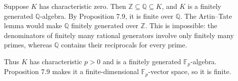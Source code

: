 Suppose $K$ has characteristic zero. Then $\mathbb{Z}\subseteq\mathbb{Q}\subseteq K$, and $K$ is a finitely generated $\mathbb{Q}$-algebra. By Proposition 7.9, it is finite over $\mathbb{Q}$. The Artin–Tate lemma would make $\mathbb{Q}$ finitely generated over $\mathbb{Z}$. This is impossible: the denominators of finitely many rational generators involve only finitely many primes, whereas $\mathbb{Q}$ contains their reciprocals for every prime.

Thus $K$ has characteristic $p>0$ and is a finitely generated $\mathbb{F}_p$-algebra. Proposition 7.9 makes it a finite-dimensional $\mathbb{F}_p$-vector space, so it is finite.
